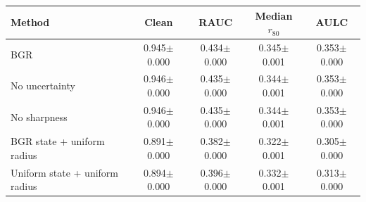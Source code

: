 \begin{tabular}{lcccc}
\hline
Method & Clean & RAUC & Median $r_{80}$ & AULC \\
\hline
BGR & 0.945$\pm$0.000 & 0.434$\pm$0.000 & 0.345$\pm$0.001 & 0.353$\pm$0.000 \\
No uncertainty & 0.946$\pm$0.000 & 0.435$\pm$0.000 & 0.344$\pm$0.001 & 0.353$\pm$0.000 \\
No sharpness & 0.946$\pm$0.000 & 0.435$\pm$0.000 & 0.344$\pm$0.001 & 0.353$\pm$0.000 \\
BGR state + uniform radius & 0.891$\pm$0.000 & 0.382$\pm$0.000 & 0.322$\pm$0.001 & 0.305$\pm$0.000 \\
Uniform state + uniform radius & 0.894$\pm$0.000 & 0.396$\pm$0.000 & 0.332$\pm$0.001 & 0.313$\pm$0.000 \\
\hline
\end{tabular}
